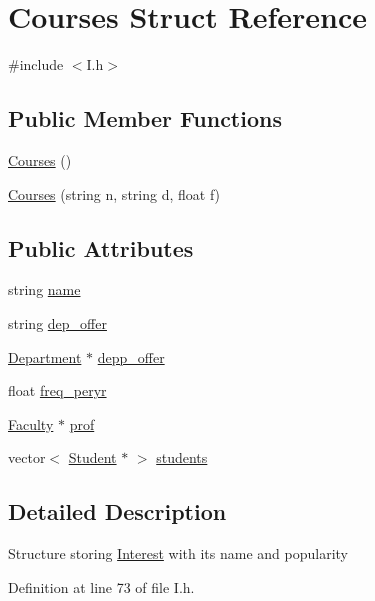 \hypertarget{structCourses}{\section{\-Courses \-Struct \-Reference}
\label{structCourses}
}


{\ttfamily \#include $<$\-I.\-h$>$}

\subsection*{\-Public \-Member \-Functions}
\begin{DoxyCompactItemize}
\item 
\hyperlink{structCourses_a575c465450af137a41125b39e0b1fc0d}{\-Courses} ()
\item 
\hyperlink{structCourses_a50d52b41a84e39192856081f6c891959}{\-Courses} (string n, string d, float f)
\end{DoxyCompactItemize}
\subsection*{\-Public \-Attributes}
\begin{DoxyCompactItemize}
\item 
string \hyperlink{structCourses_a1b69b3e3946474f0a8950647bb2277fe}{name}
\item 
string \hyperlink{structCourses_a0f0845aaff101b70edfacd7b1e5cd129}{dep\-\_\-offer}
\item 
\hyperlink{structDepartment}{\-Department} $\ast$ \hyperlink{structCourses_a1e79f4ee9b386448f55ff67c3774b2e7}{depp\-\_\-offer}
\item 
float \hyperlink{structCourses_ac26eececbf8ac75d49141c8c45f82d00}{freq\-\_\-peryr}
\item 
\hyperlink{structFaculty}{\-Faculty} $\ast$ \hyperlink{structCourses_a66b7da160aaf398d019a44070203ac74}{prof}
\item 
vector$<$ \hyperlink{structStudent}{\-Student} $\ast$ $>$ \hyperlink{structCourses_a623778fdddd17fc0ebdee5ef76ce6020}{students}
\end{DoxyCompactItemize}


\subsection{\-Detailed \-Description}
\-Structure storing \hyperlink{structInterest}{\-Interest} with its name and popularity 

\-Definition at line 73 of file \-I.\-h.



